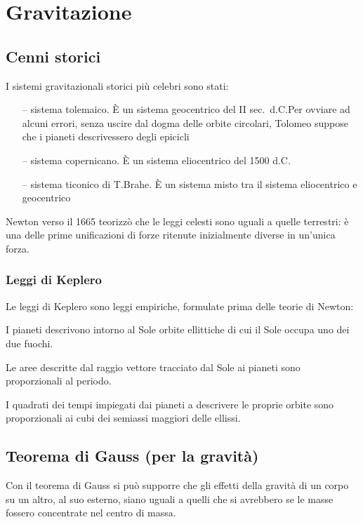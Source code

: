 \chapter{Gravitazione}
\minitoc
\section{Cenni storici}
I sistemi gravitazionali storici più celebri sono stati:
\begin{itemize}
\item[--]sistema tolemaico. \`E un sistema geocentrico del II
sec.\ d.C.\@ Per ovviare ad alcuni errori, senza uscire dal dogma
delle orbite circolari, Tolomeo suppose che i pianeti
descrivessero degli epicicli
\item[--]sistema copernicano. \`E un sistema eliocentrico del 1500
d.C.
\item[--]sistema ticonico di T.Brahe. \`E un sistema misto tra il sistema
eliocentrico e geocentrico
\end{itemize}

Newton verso il 1665 teorizzò che le leggi celesti sono uguali a quelle terrestri: è una delle prime unificazioni di forze ritenute inizialmente diverse in un'unica forza.

\subsection{Leggi di Keplero}
Le leggi di Keplero sono leggi empiriche, formulate prima delle
teorie di Newton:
\begin{legge}
I pianeti descrivono intorno al Sole orbite ellittiche di cui il Sole occupa uno dei due fuochi. \end{legge}
\begin{legge}
 Le aree descritte dal raggio vettore tracciato dal Sole ai pianeti sono proporzionali al periodo.
\end{legge}
\begin{legge}
I quadrati dei tempi impiegati dai pianeti a descrivere le proprie orbite sono proporzionali ai cubi dei semiassi maggiori delle ellissi.
\end{legge}


\section{Teorema di Gauss (per la gravità)}
Con il teorema di Gauss si può supporre che gli effetti della
gravità di un corpo su un altro, al suo esterno, siano uguali a
quelli che si avrebbero se le masse fossero concentrate nel centro
di massa.



